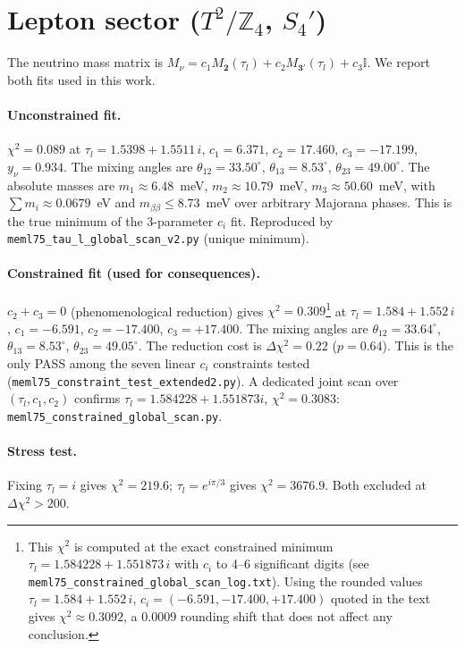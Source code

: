 \documentclass[12pt,a4paper]{article}
\numberwithin{equation}{section}
\begin{document}
\section{Lepton sector (\(T^2/\mathbb{Z}_4\), \(S_4'\))}
\label{sec:lepton}
The neutrino mass matrix is
\(M_\nu = c_1 M_{\mathbf{2}}(\tau_l) + c_2 M_{\mathbf{3}'}(\tau_l) + c_3 \mathbb{I}\).
We report both fits used in this work.

\paragraph{Unconstrained fit.}
\(\chi^2 = 0.089\) at \(\tau_l = 1.5398 + 1.5511\,i\),
\(c_1 = 6.371\), \(c_2 = 17.460\), \(c_3 = -17.199\),
\(y_\nu = 0.934\). The mixing angles are
\(\theta_{12} = 33.50^\circ\), \(\theta_{13} = 8.53^\circ\),
\(\theta_{23} = 49.00^\circ\). The absolute masses are
\(m_1 \approx 6.48\)~meV, \(m_2 \approx 10.79\)~meV,
\(m_3 \approx 50.60\)~meV, with
\(\sum m_i \approx 0.0679\)~eV and
\(m_{\beta\beta} \le 8.73\)~meV over arbitrary Majorana phases.
This is the true minimum of the 3-parameter \(c_i\) fit. Reproduced by
\texttt{meml75\_tau\_l\_global\_scan\_v2.py} (unique minimum).

\paragraph{Constrained fit (used for consequences).}
\(c_2 + c_3 = 0\) (phenomenological reduction) gives
\(\chi^2 = 0.309\)\footnote{This $\chi^2$ is computed at the exact
constrained minimum $\tau_l = 1.584228 + 1.551873\,i$ with $c_i$
to 4--6 significant digits (see
\texttt{meml75\_constrained\_global\_scan\_log.txt}). Using the
rounded values $\tau_l = 1.584 + 1.552\,i$, $c_i =
(-6.591, -17.400, +17.400)$ quoted in the text gives
$\chi^2 \approx 0.3092$, a $0.0009$ rounding shift that does not
affect any conclusion.} at \(\tau_l = 1.584 + 1.552\,i\),
\(c_1 = -6.591\), \(c_2 = -17.400\), \(c_3 = +17.400\).
The mixing angles are \(\theta_{12} = 33.64^\circ\),
\(\theta_{13} = 8.53^\circ\), \(\theta_{23} = 49.05^\circ\).
The reduction cost is \(\Delta\chi^2 = 0.22\) (\(p = 0.64\)).
This is the only PASS among the seven linear \(c_i\) constraints
tested (\texttt{meml75\_constraint\_test\_extended2.py}). A dedicated
joint scan over \((\tau_l, c_1, c_2)\) confirms
\(\tau_l = 1.584228 + 1.551873i\), \(\chi^2 = 0.3083\):
\texttt{meml75\_constrained\_global\_scan.py}.

\paragraph{Stress test.}
Fixing \(\tau_l = i\) gives \(\chi^2 = 219.6\);
\(\tau_l = e^{i\pi/3}\) gives \(\chi^2 = 3676.9\). Both excluded at
\(\Delta\chi^2 > 200\).
\end{document}
